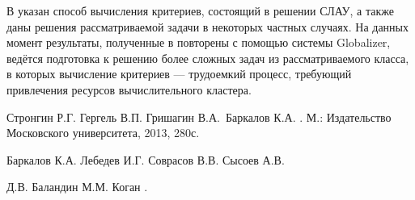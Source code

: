 \documentclass[11pt, oneside, a4paper]{article}
\begin{document}
В \cite{optControl} указан способ вычисления критериев, состоящий в решении СЛАУ,
а также даны решения рассматриваемой задачи в некоторых частных случаях. На
данных момент результаты, полученные в \cite{optControl} повторены с помощью системы Globalizer,
ведётся подготовка к решению более сложных задач из рассматриваемого класса, в которых
вычисление критериев --- трудоемкий процесс, требующий привлечения ресурсов вычислительного кластера.

\begin{biblio}

Стронгин Р.Г. Гергель В.П. Гришагин
  В.А.~Баркалов К.А.
.
\newblock М.: Издательство Московского
  университета, 2013, 280с.

Баркалов К.А. Лебедев И.Г. Соврасов В.В. Сысоев А.В.

 Д.В. Баландин М.М. Коган
 .

\end{biblio}
\end{document}

